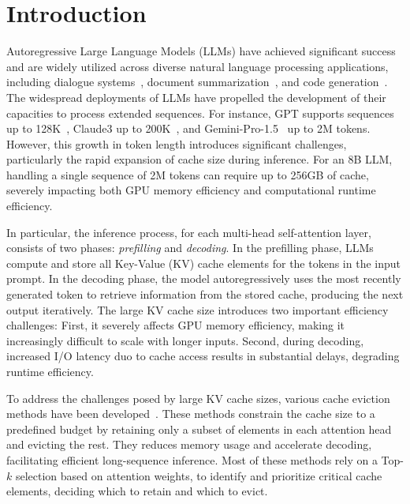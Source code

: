 \section{Introduction}
Autoregressive Large Language Models (LLMs) have achieved significant success and are widely utilized across diverse natural language processing applications, including dialogue systems~\cite{yi2024survey}, document summarization~\cite{laban2023summedits}, and code generation~\cite{gu2023llm}.
The widespread deployments of LLMs have propelled the development of their capacities to process extended sequences. For instance, GPT supports sequences up to 128K~\cite{achiam2023gpt}, Claude3 up to 200K~\cite{anthropic2024claude}, and Gemini-Pro-1.5~\cite{reid2024gemini} up to 2M tokens.
However, this growth in token length introduces significant challenges, particularly the rapid expansion of cache size during inference. For an 8B LLM, handling a single sequence of 2M tokens can require up to 256GB of cache, severely impacting both GPU memory efficiency and computational runtime efficiency.

In particular, the inference process, for each multi-head self-attention layer, consists of two phases: \textit{prefilling} and \textit{decoding}. In the prefilling phase, LLMs compute and store all Key-Value (KV) cache elements for the tokens in the input prompt.
In the decoding phase, the model autoregressively uses the most recently generated token to retrieve information from the stored cache, producing the next output iteratively.
The large KV cache size introduces two important efficiency challenges: First, it severely affects GPU memory efficiency, making it increasingly difficult to scale with longer inputs. Second, during decoding, increased I/O latency duo to cache access results in substantial delays, degrading runtime efficiency.







To address the challenges posed by large KV cache sizes, various cache eviction methods have been developed~\cite{FastGen,H2o,PyramidInfer,PyramidKV,SnapKV}.
These methods constrain the cache size to a predefined budget by retaining only a subset of elements in each attention head and evicting the rest.
They reduces memory usage and accelerate decoding, facilitating efficient long-sequence inference.
Most of these methods rely on a Top-$k$ selection based on attention weights, to identify and prioritize critical cache elements, deciding which to retain and which to evict.




